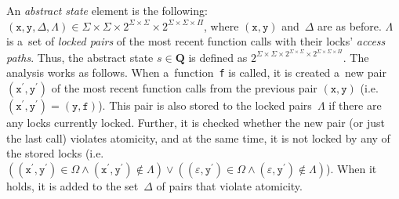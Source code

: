 An \emph{abstract state} element is the following: $ {(\mathtt{x},
\mathtt{y}, \Delta, \Lambda)} \in \Sigma \times \Sigma \times 2^{\Sigma
\times \Sigma} \times 2^{\Sigma \times \Sigma \times \Pi} $, where
${ (\mathtt{x}, \mathtt{y}) }$ and~$ \Delta $ are as before. $ \Lambda $ is
a~set of \emph{locked pairs} of the most recent function calls with
their locks' \emph{access paths}. Thus, the abstract state $ s \in
\boldsymbol{Q} $ is defined as $ 2^{\Sigma \times \Sigma \times 2^{\Sigma
\times \Sigma} \times 2^{\Sigma \times \Sigma \times \Pi}} $. The analysis
works as follows. When a~function~\texttt{f} is called, it is created a~new
pair ${ (\mathtt{x}^\prime, \mathtt{y}^\prime) }$ of the most recent function
calls from the previous pair ${ (\mathtt{x}, \mathtt{y}) }$ (i.e.
$ {(\mathtt{x}^\prime, \mathtt{y}^\prime)} = {(\mathtt{y}, \mathtt{f})} $).
This pair is also stored to the locked pairs~$ \Lambda $ if there are any
locks currently locked. Further, it is checked whether the new pair (or
just the last call) violates atomicity, and at the same time, it is not
locked by any of the stored locks (i.e. $ ({(\mathtt{x}^\prime,
\mathtt{y}^\prime)} \in \Omega \wedge {(\mathtt{x}^\prime,
\mathtt{y}^\prime)} \notin \Lambda) \vee ({(\varepsilon, \mathtt{y}^\prime)}
\in \Omega \wedge {(\varepsilon, \mathtt{y}^\prime)} \notin \Lambda) $).
When it holds, it is added to the set~$ \Delta $ of pairs that violate
atomicity.

